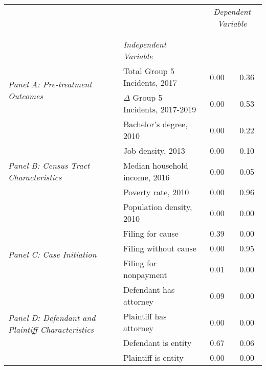 \begin{tabular}{llcc}
\toprule
 &  & \multicolumn{2}{c}{\textit{Dependent Variable}} \\
\cline{3-4}
\\
 &  &  &  \\
 & \emph{Independent Variable} &  &  \\
\midrule
\multirow[c]{2}{3cm}{\textit{Panel A: Pre-treatment Outcomes}} & Total Group 5 Incidents, 2017 & 0.00 & 0.36 \\
 & $\Delta$ Group 5 Incidents, 2017-2019 & 0.00 & 0.53 \\
\cline{1-4}
\multirow[c]{5}{3cm}{\textit{Panel B: Census Tract Characteristics}} & Bachelor's degree, 2010 & 0.00 & 0.22 \\
 & Job density, 2013 & 0.00 & 0.10 \\
 & Median household income, 2016 & 0.00 & 0.05 \\
 & Poverty rate, 2010 & 0.00 & 0.96 \\
 & Population density, 2010 & 0.00 & 0.00 \\
\cline{1-4}
\multirow[c]{3}{3cm}{\textit{Panel C: Case Initiation}} & Filing for cause & 0.39 & 0.00 \\
 & Filing without cause & 0.00 & 0.95 \\
 & Filing for nonpayment & 0.01 & 0.00 \\
\cline{1-4}
\multirow[c]{4}{3cm}{\textit{Panel D: Defendant and Plaintiff Characteristics}} & Defendant has attorney & 0.09 & 0.00 \\
 & Plaintiff has attorney & 0.00 & 0.00 \\
 & Defendant is entity & 0.67 & 0.06 \\
 & Plaintiff is entity & 0.00 & 0.00 \\
\cline{1-4}
\bottomrule
\end{tabular}
